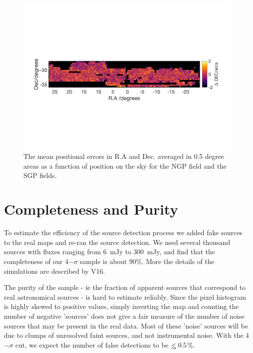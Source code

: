 \documentclass[useAMS,usenatbib]{mn2e}
\def\lesssim{\mathrel{\hbox{\rlap{\hbox{\lower4pt\hbox{$\sim$}}}\hbox{$<$}}}}
\begin{document}
\begin{figure}
\includegraphics[scale=0.6,trim={0 60mm 0mm 80mm}, clip]{sgp_ddec.png}
\caption{\protect\label{fig_pos_errs} The mean positional errors in
  R.A and Dec. averaged in 0.5 degree areas as a
  function of position on the sky for the NGP field and the SGP
  fields. 
}
\end{figure} 



\section{Completeness and Purity}

To estimate the efficiency of the source detection process we added
fake sources to the real maps and re-ran the source detection.  We
used several thousand sources with fluxes ranging from 6\ mJy to
300\ mJy, and find that the completeness of our 4$-\sigma$ sample is
about 90\%.  More the details of the simulations are described by V16.

The purity of the sample - ie the fraction of apparent sources that
correspond to real astronomical sources - is hard to estimate
reliably. Since the pixel histogram is highly skewed to positive
values, simply inverting the map and counting the number of negative
'sources' does not give a fair measure of the number of noise sources
that may be present in the real data. Most of these 'noise' sources will
be due to clumps of unresolved faint sources, and not instrumental
noise. With the 4$-\sigma$ cut, we expect the number of false
detections to be $\lesssim 0.5$\%. 


%
\end{document}
